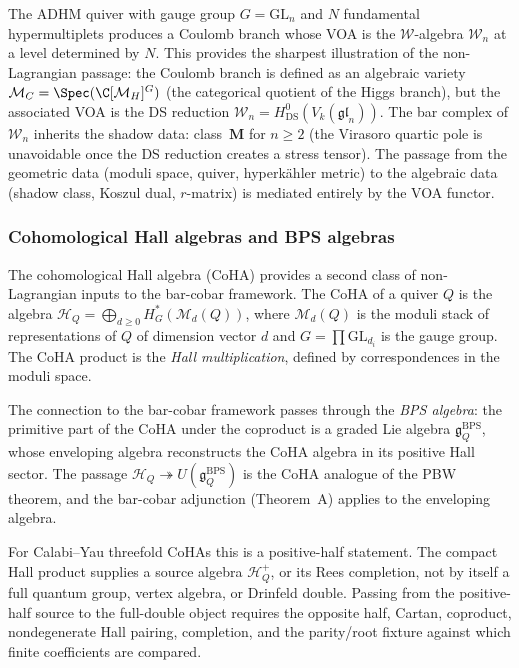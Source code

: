 \begin{example}
\label{ex:adhm-coulomb}
The ADHM quiver with gauge group $G = \mathrm{GL}_n$ and $N$
fundamental hypermultiplets produces a Coulomb branch whose VOA
is the $\mathcal{W}$-algebra $\mathcal{W}_n$
at a level determined by $N$. This provides the sharpest
illustration of the non-Lagrangian passage: the Coulomb branch
is defined as an algebraic variety
$\mathcal{M}_C = \Spec(\C[\mathcal{M}_H]^G)$
(the categorical quotient of the Higgs branch), but the
associated VOA is the DS reduction
$\mathcal{W}_n = H^0_{\mathrm{DS}}(V_k(\mathfrak{gl}_n))$.
The bar complex of $\mathcal{W}_n$ inherits the shadow data:
class~$\mathbf{M}$ for $n \ge 2$ (the Virasoro quartic pole is
unavoidable once the DS reduction creates a stress tensor).
The passage from the geometric data (moduli space, quiver,
hyperk\"ahler metric) to the algebraic data (shadow class,
Koszul dual, $r$-matrix) is mediated entirely by the VOA
functor.
\end{example}

\subsubsection{Cohomological Hall algebras and BPS algebras}

The cohomological Hall algebra (CoHA)
\cite{kontsevich-soibelman,SV13}
provides a second class of non-Lagrangian inputs to the bar-cobar
framework. The CoHA of a quiver $Q$ is the algebra
$\mathcal{H}_Q = \bigoplus_{d \ge 0} H^*_G(\mathcal{M}_d(Q))$,
where $\mathcal{M}_d(Q)$ is the moduli stack of representations of
$Q$ of dimension vector $d$ and $G = \prod \mathrm{GL}_{d_i}$ is the
gauge group. The CoHA product is the \emph{Hall multiplication},
defined by correspondences in the moduli space.

The connection to the bar-cobar framework passes through the
\emph{BPS algebra}: the primitive part of the CoHA under the
coproduct is a graded Lie algebra
$\mathfrak{g}_Q^{\mathrm{BPS}}$, whose enveloping algebra
reconstructs the CoHA algebra in its positive Hall sector. The passage
$\mathcal{H}_Q \twoheadrightarrow U(\mathfrak{g}_Q^{\mathrm{BPS}})$
is the CoHA analogue of the PBW theorem, and the bar-cobar
adjunction (Theorem~A) applies to the enveloping algebra.

For Calabi--Yau threefold CoHAs this is a positive-half statement.
The compact Hall product supplies a source algebra
$\mathcal H_Q^{+}$, or its Rees completion, not by itself a full
quantum group, vertex algebra, or Drinfeld double. Passing from the
positive-half source to the full-double object requires the opposite
half, Cartan, coproduct, nondegenerate Hall pairing, completion, and
the parity/root fixture against which finite coefficients are compared.

